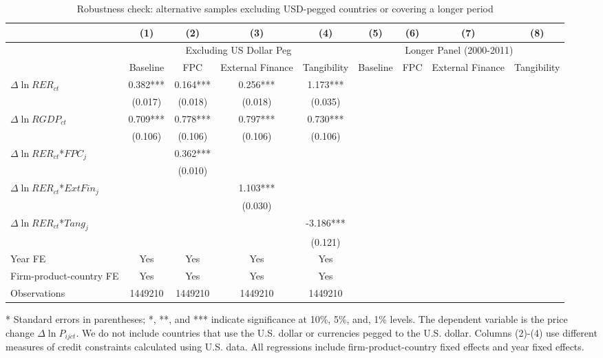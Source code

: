 \documentclass[12pt]{article}
\begin{document}
\begin{table}
	\centering
	\caption{Robustness check: alternative samples excluding USD-pegged countries or covering a longer period}
	\begin{threeparttable}
	\begin{tabular}{lcccccccc}
		\toprule
		& (1)   & (2)   & (3)   & (4) & (5)   & (6)   & (7)   & (8)\\
		\midrule
		& \multicolumn{4}{c}{Excluding US Dollar Peg} & \multicolumn{4}{c}{Longer Panel (2000-2011)}\\
		& Baseline & FPC   & External Finance & Tangibility & Baseline & FPC   & External Finance & Tangibility \\
		\midrule
		$\Delta \ln RER_{ct}$ & 0.382*** & 0.164*** & 0.256*** & 1.173*** &&&&\\
		& (0.017) & (0.018) & (0.018) & (0.035) &&&&\\
		$\Delta \ln RGDP_{ct}$ & 0.709*** & 0.778*** & 0.797*** & 0.730*** &&&&\\
		& (0.106) & (0.106) & (0.106) & (0.106) &&&&\\
		$\Delta \ln RER_{ct}$*$FPC_{j}$ &       & 0.362*** &       &  &&&& \\
		&       & (0.010) &       &  &&&&\\
		$\Delta \ln RER_{ct}$*$ExtFin_{j}$ &       &       & 1.103*** &  &&&&\\
		&       &       & (0.030) &  &&&&\\
		$\Delta \ln RER_{ct}$*$Tang_{j}$ &       &       &       & -3.186*** &&&&\\
		&       &       &       & (0.121) &&&&\\
		Year FE  &   Yes    & Yes   & Yes   & Yes &&&&\\
		Firm-product-country FE &   Yes    & Yes   & Yes   & Yes &&&&\\
		Observations & 1449210 & 1449210 & 1449210 & 1449210 &&&&\\
		\bottomrule
	\end{tabular}
	\begin{tablenotes}
		\footnotesize
		\item[*] Standard errors in parentheses; *, **, and *** indicate significance at 10\%, 5\%, and, 1\% levels. The dependent variable is the price change $\Delta \ln P_{ijct}$. We do not include countries that use the U.S. dollar or currencies pegged to the U.S. dollar. Columns (2)-(4) use different measures of credit constraints calculated using U.S. data. All regressions include firm-product-country fixed effects and year fixed effects.
	\end{tablenotes}
        \end{threeparttable}
        \label{tab.robust.nopeg}
\end{table}
\end{document}
